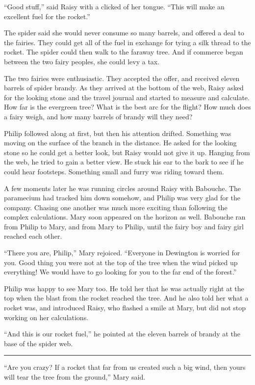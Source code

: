 \documentclass[10pt, draft]{memoir}
\renewcommand{\pfbreakdisplay}{\bigskip \ding{166} \bigskip}
\newcommand{\secbreak}{\fancybreak{\pfbreakdisplay}}
\begin{document}
``Good stuff,'' said Raisy with a clicked of her tongue. ``This will make an excellent fuel for the rocket.''

The spider said she would never consume so many barrels, and offered a deal to the fairies. They could get all of the fuel in exchange for tying a silk thread to the rocket. The spider could then walk to the faraway tree. And if commerce began between the two fairy peoples, she could levy a tax.

The two fairies were enthusiastic. They accepted the offer, and received eleven barrels of spider brandy. As they arrived at the bottom of the web, Raisy asked for the looking stone and the travel journal and started to measure and calculate. How far is the evergreen tree? What is the best arc for the flight? How much does a fairy weigh, and how many barrels of brandy will they need?

Philip followed along at first, but then his attention drifted. Something was moving on the surface of the branch in the distance. He asked for the looking stone so he could get a better look, but Raisy would not give it up. Hanging from the web, he tried to gain a better view. He stuck his ear to the bark to see if he could hear footsteps. Something small and furry was riding toward them.

A few moments later he was running circles around Raisy with Babouche. The paramecium had tracked him down somehow, and Philip was very glad for the company. Chasing one another was much more exciting than following the complex calculations. Mary soon appeared on the horizon as well. Babouche ran from Philip to Mary, and from Mary to Philip, until the fairy boy and fairy girl reached each other.

``There you are, Philip,'' Mary rejoiced. ``Everyone in Dewington is worried for you. Good thing you were not at the top of the tree when the wind picked up everything! We would have to go looking for you to the far end of the forest.''

Philip was happy to see Mary too. He told her that he was actually right at the top when the blast from the rocket reached the tree. And he also told her what a rocket was, and introduced Raisy, who flashed a smile at Mary, but did not stop working on her calculations.

``And this is our rocket fuel,'' he pointed at the eleven barrels of brandy at the base of the spider web.

\secbreak

``Are you crazy? If a rocket that far from us created such a big wind, then yours will tear the tree from the ground,'' Mary said.
\end{document}
